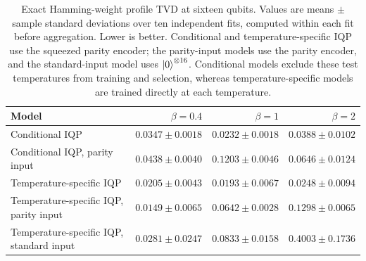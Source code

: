 \begin{table}[t]
\centering
\small
\caption{Exact Hamming-weight profile TVD at sixteen qubits. Values are means $\pm$ sample standard deviations over ten independent fits, computed within each fit before aggregation. Lower is better. Conditional and temperature-specific IQP use the squeezed parity encoder; the parity-input models use the parity encoder, and the standard-input model uses $\ket{0}^{\otimes16}$. Conditional models exclude these test temperatures from training and selection, whereas temperature-specific models are trained directly at each temperature.}
\label{tab:curie_weiss_profile_tvd}
\begin{tabular}{lrrr}
\toprule
Model & $\beta=0.4$ & $\beta=1$ & $\beta=2$ \\
\midrule
Conditional IQP & $0.0347\pm0.0018$ & $0.0232\pm0.0018$ & $0.0388\pm0.0102$ \\
Conditional IQP, parity input & $0.0438\pm0.0040$ & $0.1203\pm0.0046$ & $0.0646\pm0.0124$ \\
Temperature-specific IQP & $0.0205\pm0.0043$ & $0.0193\pm0.0067$ & $0.0248\pm0.0094$ \\
Temperature-specific IQP, parity input & $0.0149\pm0.0065$ & $0.0642\pm0.0028$ & $0.1298\pm0.0065$ \\
Temperature-specific IQP, standard input & $0.0281\pm0.0247$ & $0.0833\pm0.0158$ & $0.4003\pm0.1736$ \\
\bottomrule
\end{tabular}
\end{table}
